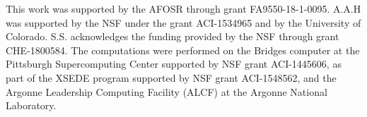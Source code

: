 \documentclass[%
reprint,
 superscriptaddress,
 amsmath,amssymb,
 aps,
]{revtex4-1}
\begin{document}
\begin{acknowledgements}
This work was supported by the AFOSR through grant FA9550-18-1-0095.
A.A.H was supported by the NSF under the grant ACI-1534965 and by the University of Colorado.
S.S. acknowledges the funding provided by the NSF through grant CHE-1800584.
The computations were performed on the Bridges computer at the Pittsburgh Supercomputing Center supported by NSF grant ACI-1445606, as part of the XSEDE program supported by NSF grant ACI-1548562,
and the Argonne Leadership Computing Facility (ALCF) at the Argonne National Laboratory.
\end{acknowledgements}





%

%


%
\end{document}
